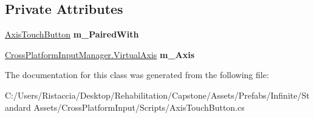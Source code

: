 \subsection*{Private Attributes}
\begin{DoxyCompactItemize}
\item 
\mbox{\label{class_unity_standard_assets_1_1_cross_platform_input_1_1_axis_touch_button_a3afb3549fb6282f0e3e4c1a7b6051f13}} 
\hyperlink{class_unity_standard_assets_1_1_cross_platform_input_1_1_axis_touch_button}{Axis\+Touch\+Button} {\bfseries m\+\_\+\+Paired\+With}
\item 
\mbox{\label{class_unity_standard_assets_1_1_cross_platform_input_1_1_axis_touch_button_a1a08a4a08e1ac408a259421533611587}} 
\hyperlink{class_unity_standard_assets_1_1_cross_platform_input_1_1_cross_platform_input_manager_1_1_virtual_axis}{Cross\+Platform\+Input\+Manager.\+Virtual\+Axis} {\bfseries m\+\_\+\+Axis}
\end{DoxyCompactItemize}


The documentation for this class was generated from the following file\+:\begin{DoxyCompactItemize}
\item 
C\+:/\+Users/\+Ristaccia/\+Desktop/\+Rehabilitation/\+Capstone/\+Assets/\+Prefabs/\+Infinite/\+Standard Assets/\+Cross\+Platform\+Input/\+Scripts/Axis\+Touch\+Button.\+cs\end{DoxyCompactItemize}
